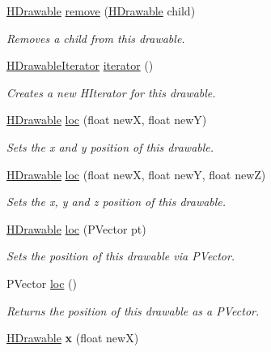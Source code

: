 \begin{DoxyCompactItemize}
\hyperlink{classhype_1_1drawable_1_1_h_drawable}{H\-Drawable} \hyperlink{classhype_1_1drawable_1_1_h_drawable_a3c326700c8b7b41da16d435730c6706b}{remove} (\hyperlink{classhype_1_1drawable_1_1_h_drawable}{H\-Drawable} child)
\begin{DoxyCompactList}\small\item\em Removes a child from this drawable. \end{DoxyCompactList}\item 
\hyperlink{classhype_1_1drawable_1_1_h_drawable_1_1_h_drawable_iterator}{H\-Drawable\-Iterator} \hyperlink{classhype_1_1drawable_1_1_h_drawable_ae15ca1c6555696a54faa7b61b3bcc1ff}{iterator} ()
\begin{DoxyCompactList}\small\item\em Creates a new H\-Iterator for this drawable. \end{DoxyCompactList}\item 
\hyperlink{classhype_1_1drawable_1_1_h_drawable}{H\-Drawable} \hyperlink{classhype_1_1drawable_1_1_h_drawable_aa8daf32b814e1e5b9de2ff1e832f3f8d}{loc} (float new\-X, float new\-Y)
\begin{DoxyCompactList}\small\item\em Sets the x and y position of this drawable. \end{DoxyCompactList}\item 
\hyperlink{classhype_1_1drawable_1_1_h_drawable}{H\-Drawable} \hyperlink{classhype_1_1drawable_1_1_h_drawable_a038b80d3aa227ff8f7ec2acdfdd09baf}{loc} (float new\-X, float new\-Y, float new\-Z)
\begin{DoxyCompactList}\small\item\em Sets the x, y and z position of this drawable. \end{DoxyCompactList}\item 
\hyperlink{classhype_1_1drawable_1_1_h_drawable}{H\-Drawable} \hyperlink{classhype_1_1drawable_1_1_h_drawable_afbaa98393436b661f7686ab3babcb01a}{loc} (P\-Vector pt)
\begin{DoxyCompactList}\small\item\em Sets the position of this drawable via P\-Vector. \end{DoxyCompactList}\item 
P\-Vector \hyperlink{classhype_1_1drawable_1_1_h_drawable_af14ffd5baa83781131e96ef30915ca64}{loc} ()
\begin{DoxyCompactList}\small\item\em Returns the position of this drawable as a P\-Vector. \end{DoxyCompactList}\item 
\hypertarget{classhype_1_1drawable_1_1_h_drawable_aae828fe1677025d019df207f62771def}{\hyperlink{classhype_1_1drawable_1_1_h_drawable}{H\-Drawable} {\bfseries x} (float new\-X)}\label{classhype_1_1drawable_1_1_h_drawable_aae828fe1677025d019df207f62771def}


\end{DoxyCompactItemize}
